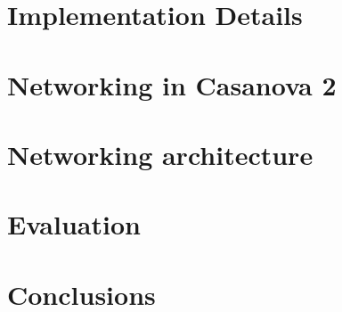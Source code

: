\documentclass[conference]{IEEEtran}
\begin{document}
\section{Implementation Details}
\label{sec:details}


\section{Networking in Casanova 2}
\label{sec:networking}


\section{Networking architecture}
\label{sec:net_architecture}


\section{Evaluation}
\label{sec:evaluation}


\section{Conclusions}
\label{sec:conclusions_and_future_works}










\end{document}
